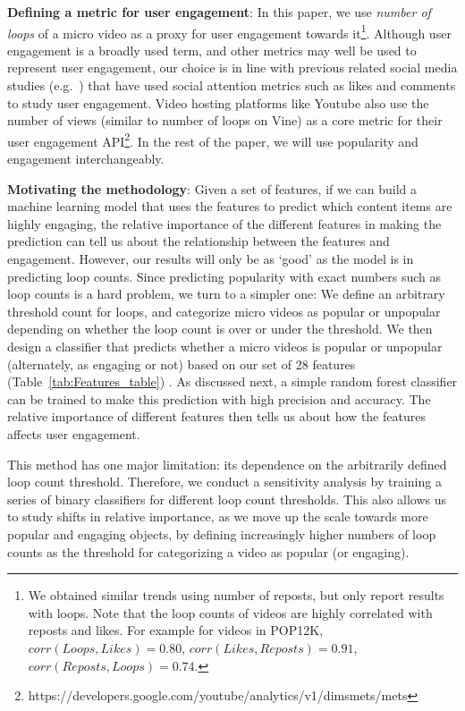 \noindent\textbf{Defining a metric for user engagement}:  In this paper, we  use \emph{number of loops} of a micro video as a proxy for user engagement towards it\footnote{We obtained similar trends using number of reposts, but only report results with loops. Note that the loop counts of videos are highly correlated with reposts and likes. For example for videos in POP12K, $ corr(Loops,Likes) = 0.80$, $corr(Likes,Reposts) = 0.91$, $corr(Reposts,Loops) = 0.74$.}.
Although user engagement is a broadly used term, and other metrics may well be used to represent user engagement, our choice is in line with previous related social media studies (e.g.~\cite{bakhshi2014faces})  that have used social attention metrics such as likes and comments to study user engagement. Video hosting platforms like Youtube also use the number of views (similar to number of loops on Vine) as a core metric for their user engagement API\footnote{\scriptsize https://developers.google.com/youtube/analytics/v1/dimsmets/mets}. In the rest of the paper, we will use popularity and engagement interchangeably.

\noindent\textbf{Motivating the methodology}: 
Given a set of features, if we can build a machine learning model that uses the features to predict which content items are highly engaging, the relative importance of the different features in making the prediction can tell us about the relationship between the features and engagement. However, our results will only be as `good' as the model is in predicting loop counts. Since predicting popularity with exact numbers such as loop counts is a hard problem, we turn to a simpler one: We define an arbitrary threshold count for loops, and categorize micro videos as popular or unpopular depending on whether the loop count is over or under the threshold.  We then design a classifier that predicts whether a micro videos is popular or unpopular (alternately, as engaging or not) based on our set of 28 features (Table~\ref{tab:Features_table}) . As discussed next, a simple random forest classifier can be trained to make this prediction with high precision and accuracy. The relative importance of different features then tells us about how the features affects user engagement.

This method has one major limitation: its dependence on the arbitrarily defined loop count threshold. Therefore, we conduct a  sensitivity analysis by training a series of binary classifiers for different loop count thresholds. This also allows us to study shifts in relative importance, as we move up the scale towards more popular and engaging objects, by defining increasingly higher numbers of loop counts as the threshold for categorizing a video as popular (or engaging). 

